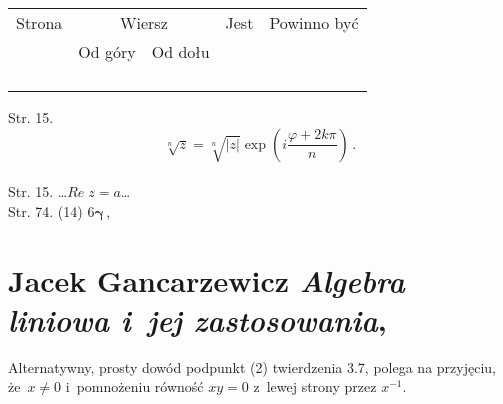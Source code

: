 \documentclass[a4paper,11pt]{article}
\numberwithin{equation}{section}
\begin{document}


\begin{center}

  \begin{tabular}{|c|c|c|c|c|}
    \hline
    Strona & \multicolumn{2}{c|}{Wiersz} & Jest
                              & Powinno być \\ \cline{2-3}
    & Od góry & Od dołu & & \\
    \hline
    & & & & \\
    & & & & \\
    & & & & \\
    & & & & \\
    \hline
  \end{tabular}

\end{center}

\VerSpaceSix


Str. 15.
$$\sqrt[ n ]{ z } = \sqrt[ n ]{ | z | } \exp( i \frac{ \varphi + 2 k
  \pi }{ n } ) \, .$$ \\
Str. 15. \ldots $Re \; z = a$\ldots \\
Str. 74. (14) $6 \boldsymbol{ \gamma } \, ,$ \\













\section{Jacek Gancarzewicz
  \textit{Algebra liniowa i~jej zastosowania},
  \cite{GancarzewiczAlgebraLiniowa2004}}

\vspace{0em}



\vspace{0em}


\noindent
{}

\VerSpaceFour





\noindent
{} Alternatywny, prosty dowód podpunkt (2) twierdzenia
3.7, polega na przyjęciu, że~$x \neq 0$ i~pomnożeniu równość $xy = 0$
z~lewej strony przez $x^{ -1 }$.
\end{document}

